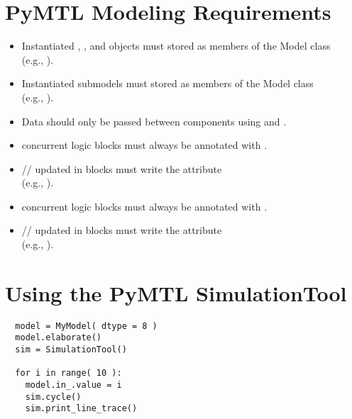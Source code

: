 \documentclass{cbxdoc}
\begin{document}
\section{PyMTL Modeling Requirements}
\begin{itemize} %
  \item Instantiated , , and  objects must
         stored as members of the Model class \\
         (e.g., ).
  \item Instantiated submodels must stored as members of the Model class \\
         (e.g., ).
  \item Data should only be passed between components using 
         and .
  \item {} concurrent logic blocks must always be annotated
         with .
  \item {}// updated in 
         blocks must write the \underline{} attribute \\
         (e.g., ).
  \item {} concurrent logic blocks must always be
         annotated with .
  \item {}// updated in 
         blocks must write the \underline{} attribute \\
         (e.g., ).
\end{itemize}


\section{Using the PyMTL SimulationTool}
\begin{verbatim}
  model = MyModel( dtype = 8 ) 
  model.elaborate()
  sim = SimulationTool()

  for i in range( 10 ):
    model.in_.value = i
    sim.cycle()
    sim.print_line_trace()
\end{verbatim}
\end{document}
